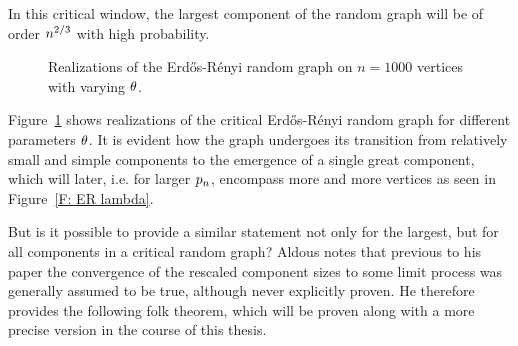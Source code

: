 In this critical window, the largest component of the random graph will be of order $n^{2 / 3}$ with high probability.

\begin{figure}[h]
	\centering
	\quad
	\quad
	\caption{Realizations of the Erd\H{o}s-Rényi random graph on $n=1000$ vertices with varying $\theta$.}%
	\label{F: ER p}%
\end{figure}

Figure~\ref{F: ER p} shows realizations of the critical Erd\H{o}s-Rényi random graph for different parameters $\theta$.
It is evident how the graph undergoes its transition from relatively small and simple components 
to the emergence of a single great component, which will later, i.e. for larger $p_n$,
encompass more and more vertices as seen in Figure~\ref{F: ER lambda}.

\bigskip

But is it possible to provide a similar statement not only for the largest, but for all components in a critical random graph?
Aldous notes that previous to his paper
the convergence of the rescaled component sizes to some limit process was generally assumed to be true,
although never explicitly proven.
He therefore provides the following folk theorem,
which will be proven along with a more precise version in the course of this thesis.

